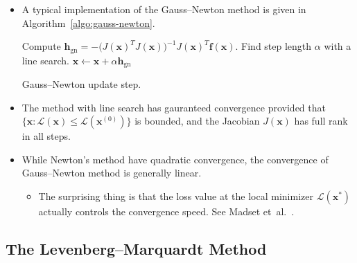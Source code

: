 \documentclass[10pt]{article}
\newcommand{\ve}[1]{\mathbf{#1}}
\newcommand{\mrm}[1]{\mathrm{#1}}
\newcommand{\etal}{{et~al.}}
\newcommand{\mcal}[1]{\mathcal{#1}}
\begin{document}
\begin{itemize}
    \item A typical implementation of the Gauss--Newton method is given in Algorithm~\ref{algo:gauss-newton}.

    \begin{algorithm}[t]
        \begin{algorithmic}
            \State Compute $\ve{h}_{\mrm{gn}} =  - \big(J(\ve{x})^TJ(\ve{x})\big)^{-1} J(\ve{x})^T \ve{f}(\ve{x})$.
            \State Find step length $\alpha$ with a line search.
            \State $\ve{x} \gets \ve{x} + \alpha \ve{h}_{\mrm{gn}}$
        \end{algorithmic}
        \caption{Gauss--Newton update step.}
        \label{algo:gauss-newton}
    \end{algorithm}

    \item The method with line search has gauranteed convergence provided that $\{ \ve{x} : \mcal{L}(\ve{x}) \leq \mcal{L}(\ve{x}^{(0)}) \}$ is bounded, and the Jacobian $J(\ve{x})$ has full rank in all steps.
    
    \item While Newton's method have quadratic convergence, the convergence of Gauss--Newton method is generally linear.
    \begin{itemize}
        \item The surprising thing is that the loss value at the local minimizer $\mcal{L}(\ve{x}^*)$ actually controls the convergence speed. See Madset \etal~\cite{Madsen:2004}.
    \end{itemize}    
\end{itemize}

\subsection{The Levenberg--Marquardt Method}
\end{document}
